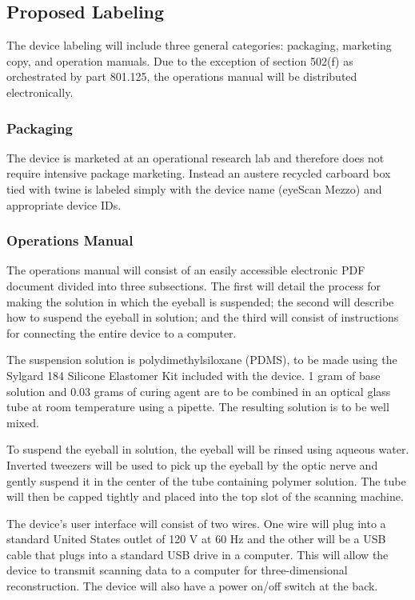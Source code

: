 \subsection{Proposed Labeling}

The device labeling will include three general categories: packaging,
marketing copy, and operation manuals. Due to the exception of section
502(f) as orchestrated by part 801.125, the operations manual will be
distributed electronically.

\subsubsection{Packaging}
The device is marketed at an operational research lab and therefore
does not require intensive package marketing. Instead an austere
recycled carboard box tied with twine is labeled simply with the
device name (eyeScan Mezzo) and appropriate device IDs.

\subsubsection{Operations Manual}
The operations manual will consist of an easily accessible electronic PDF document divided
into three subsections. The first will detail the process for making
the solution in which the eyeball is suspended; the second will
describe how to suspend the eyeball in solution; and the third will
consist of instructions for connecting the entire device to a
computer.

The suspension solution is polydimethylsiloxane (PDMS), to be made
using the Sylgard 184 Silicone Elastomer Kit included with the device. 1 gram of base solution
and 0.03 grams of curing agent are to be combined in an optical glass
tube at room temperature using a pipette. The resulting solution is to
be well mixed.

To suspend the eyeball in solution, the eyeball will be rinsed
using aqueous water. Inverted tweezers will be used to pick up the
eyeball by the optic nerve and gently suspend it in the center of the
tube containing polymer solution. The tube will then be capped tightly
and placed into the top slot of the scanning machine.

The device’s user interface will consist of two wires. One wire will
plug into a standard United States outlet of 120 V at 60 Hz and the
other will be a USB cable that plugs into a standard USB drive in a
computer. This will allow the device to transmit scanning data to a
computer for three-dimensional reconstruction. The device will also
have a power on/off switch at the back.

